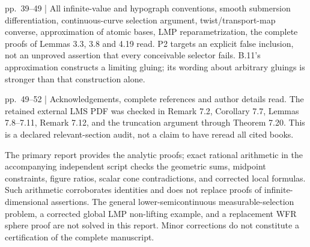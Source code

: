 \documentclass[10pt]{article}
\begin{document}
pp. 39–49 | All infinite-value and hypograph conventions, smooth submersion differentiation, continuous-curve selection argument, twist/transport-map converse, approximation of atomic bases, LMP reparametrization, the complete proofs of Lemmas 3.3, 3.8 and 4.19 read. P2 targets an explicit false inclusion, not an unproved assertion that every conceivable selector fails. B.11’s approximation constructs a limiting gluing; its wording about arbitrary gluings is stronger than that construction alone.\par
pp. 49–52 | Acknowledgements, complete references and author details read. The retained external LMS PDF was checked in Remark 7.2, Corollary 7.7, Lemmas 7.8–7.11, Remark 7.12, and the truncation argument through Theorem 7.20. This is a declared relevant-section audit, not a claim to have reread all cited books.\par
The primary report provides the analytic proofs; exact rational arithmetic in the accompanying independent script checks the geometric sums, midpoint constraints, figure ratios, scalar cone contradictions, and corrected local formulas. Such arithmetic corroborates identities and does not replace proofs of infinite-dimensional assertions. The general lower-semicontinuous measurable-selection problem, a corrected global LMP non-lifting example, and a replacement WFR sphere proof are not solved in this report. Minor corrections do not constitute a certification of the complete manuscript.\par
\end{document}
